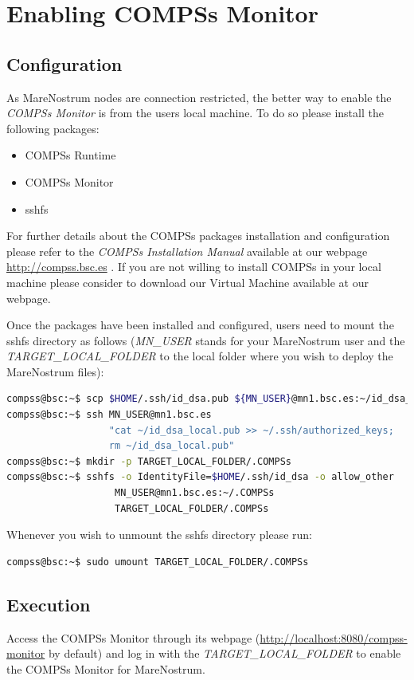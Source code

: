 \section{Enabling COMPSs Monitor}
\label{sec:Monitor}


\subsection{Configuration}
As MareNostrum nodes are connection restricted, the better way to enable the \textit{COMPSs Monitor} is from the users local machine. 
To do so please install the following packages:
\begin{itemize}
 \item COMPSs Runtime
 \item COMPSs Monitor
 \item sshfs
\end{itemize}

For further details about the COMPSs packages installation and configuration please refer to the \textit{COMPSs Installation Manual} 
available at our webpage \url{http://compss.bsc.es} . If you are not willing to install COMPSs in your local machine please consider
to download our Virtual Machine available at our webpage. 
\newline

Once the packages have been installed and configured, users need to mount the sshfs directory as follows (\textit{MN\_USER} stands for 
your MareNostrum user and the \textit{TARGET\_LOCAL\_FOLDER} to the local folder where you wish to deploy the MareNostrum files):
\begin{lstlisting}[language=bash]
compss@bsc:~$ scp $HOME/.ssh/id_dsa.pub ${MN_USER}@mn1.bsc.es:~/id_dsa_local.pub
compss@bsc:~$ ssh MN_USER@mn1.bsc.es 
                  "cat ~/id_dsa_local.pub >> ~/.ssh/authorized_keys; 
                  rm ~/id_dsa_local.pub"
compss@bsc:~$ mkdir -p TARGET_LOCAL_FOLDER/.COMPSs
compss@bsc:~$ sshfs -o IdentityFile=$HOME/.ssh/id_dsa -o allow_other 
                   MN_USER@mn1.bsc.es:~/.COMPSs 
                   TARGET_LOCAL_FOLDER/.COMPSs
\end{lstlisting}

Whenever you wish to unmount the sshfs directory please run:
\begin{lstlisting}[language=bash]
compss@bsc:~$ sudo umount TARGET_LOCAL_FOLDER/.COMPSs
\end{lstlisting}


\subsection{Execution}
Access the COMPSs Monitor through its webpage (\url{http://localhost:8080/compss-monitor} by default) and log in with the 
\textit{TARGET\_LOCAL\_FOLDER} to enable the COMPSs Monitor for MareNostrum. 

